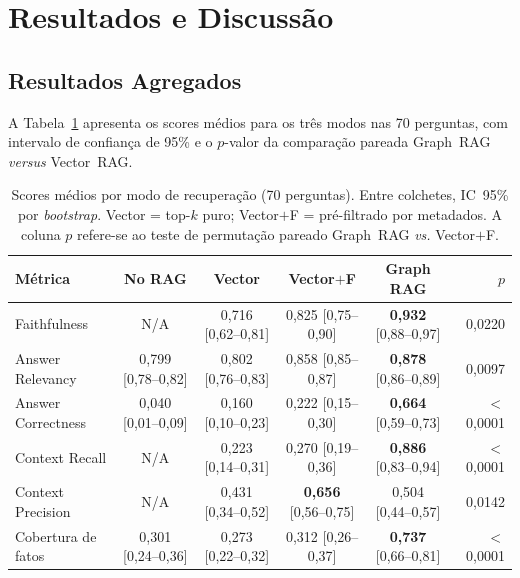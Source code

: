 \documentclass[conference]{IEEEtran}
\begin{document}
\section{Resultados e Discussão}
\label{sec:resultados}

\subsection{Resultados Agregados}

A Tabela~\ref{tab:ragas} apresenta os scores médios para os três modos
nas 70 perguntas, com intervalo de confiança de 95\% e o $p$-valor da
comparação pareada Graph~RAG {\itshape versus} Vector~RAG.

\begin{table}[htbp]
\caption{Scores médios por modo de recuperação (70 perguntas).
  Entre colchetes, IC~95\% por \textit{bootstrap}. Vector = top-$k$ puro;
  Vector$+$F = pré-filtrado por metadados. A coluna $p$ refere-se ao teste de
  permutação pareado Graph~RAG {\itshape vs.} Vector$+$F.}
\label{tab:ragas}
\begin{center}
\footnotesize
\begin{tabular}{lcccc r}
\toprule
\textbf{Métrica} & \textbf{No RAG} & \textbf{Vector} & \textbf{Vector$+$F} & \textbf{Graph RAG} & \textbf{$p$} \\
\midrule
Faithfulness & N/A & 0,716 {\tiny[0,62--0,81]} & 0,825 {\tiny[0,75--0,90]} & \textbf{0,932} {\tiny[0,88--0,97]} & 0,0220 \\
Answer Relevancy & 0,799 {\tiny[0,78--0,82]} & 0,802 {\tiny[0,76--0,83]} & 0,858 {\tiny[0,85--0,87]} & \textbf{0,878} {\tiny[0,86--0,89]} & 0,0097 \\
Answer Correctness & 0,040 {\tiny[0,01--0,09]} & 0,160 {\tiny[0,10--0,23]} & 0,222 {\tiny[0,15--0,30]} & \textbf{0,664} {\tiny[0,59--0,73]} & $<$0,0001 \\
Context Recall & N/A & 0,223 {\tiny[0,14--0,31]} & 0,270 {\tiny[0,19--0,36]} & \textbf{0,886} {\tiny[0,83--0,94]} & $<$0,0001 \\
Context Precision & N/A & 0,431 {\tiny[0,34--0,52]} & \textbf{0,656} {\tiny[0,56--0,75]} & 0,504 {\tiny[0,44--0,57]} & 0,0142 \\
Cobertura de fatos & 0,301 {\tiny[0,24--0,36]} & 0,273 {\tiny[0,22--0,32]} & 0,312 {\tiny[0,26--0,37]} & \textbf{0,737} {\tiny[0,66--0,81]} & $<$0,0001 \\
\bottomrule
\end{tabular}
\end{center}
\end{table}
\end{document}
